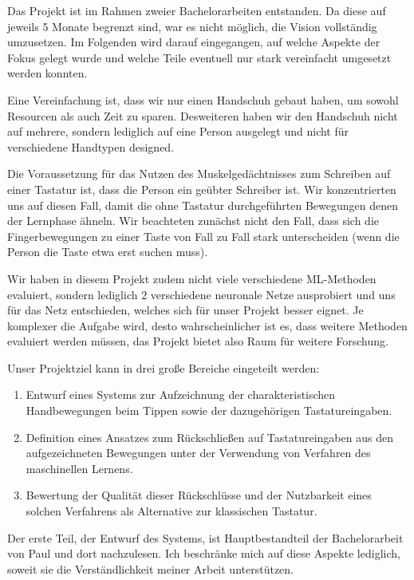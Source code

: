 Das Projekt ist im Rahmen zweier Bachelorarbeiten entstanden. Da diese auf jeweils 5 Monate begrenzt sind, war es nicht möglich, die Vision vollständig umzusetzen.
Im Folgenden wird darauf eingegangen, auf welche Aspekte der Fokus gelegt wurde und welche Teile eventuell nur stark vereinfacht umgesetzt werden konnten.

Eine Vereinfachung ist, dass wir nur einen Handschuh gebaut haben, um sowohl Resourcen als auch Zeit zu sparen.
Desweiteren haben wir den Handschuh nicht auf mehrere, sondern lediglich auf eine Person ausgelegt und nicht für verschiedene Hand\-typen designed.

Die Voraussetzung für das Nutzen des Muskelgedächtnisses zum Schreiben auf einer Tastatur ist, dass die Person ein geübter Schreiber ist. Wir konzentrierten uns auf diesen Fall, damit die ohne Tastatur durchgeführten Bewegungen denen der Lernphase ähneln. Wir beachteten zunächst nicht den Fall, dass sich die Fingerbewegungen zu einer Taste von Fall zu Fall stark unterscheiden (wenn die Person die Taste etwa erst suchen muss).

Wir haben in diesem Projekt zudem nicht viele verschiedene ML-Methoden evaluiert, sondern lediglich 2 verschiedene neuronale Netze ausprobiert und uns für das Netz entschieden, welches sich für unser Projekt besser eignet. Je komplexer die Aufgabe wird, desto wahrscheinlicher ist es, dass weitere Methoden evaluiert werden müssen, das Projekt bietet also Raum für weitere Forschung.

Unser Projektziel kann in drei große Bereiche eingeteilt werden:

\begin{enumerate}
    \item Entwurf eines Systems zur Aufzeichnung der charakteristischen Handbewegungen beim Tippen sowie der dazugehörigen Tastatureingaben.
    \item Definition eines Ansatzes zum Rückschließen auf Tastatureingaben aus den aufgezeichneten Bewegungen unter der Verwendung von Verfahren des maschinellen Lernens.
    \item Bewertung der Qualität dieser Rückschlüsse und der Nutzbarkeit eines solchen Verfahrens als Alternative zur klassischen Tastatur.
\end{enumerate}

Der erste Teil, der Entwurf des Systems, ist Hauptbestandteil der Bachelorarbeit von Paul \citet{paul} und dort nachzulesen. Ich beschränke mich auf diese Aspekte lediglich, soweit sie die Verständlichkeit meiner Arbeit unterstützen.

